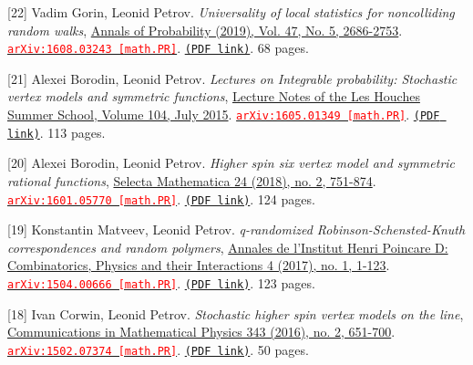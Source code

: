 \begin{etaremune}
\item[{[22]}] 
Vadim Gorin, Leonid Petrov.
\emph{Universality of local statistics for noncolliding random walks}, \href{}{Annals of Probability (2019), Vol. 47, No. 5, 2686-2753}. 
\href{https://arxiv.org/abs/1608.03243}{\texttt{{\textcolor{red}{arXiv:1608.03243 [math.PR]}}}}. \href{https://storage.lpetrov.cc/papers/22-universality_of_local.pdf}{\texttt{(PDF link)}}. 68 pages.



\item[{[21]}] 
Alexei Borodin, Leonid Petrov.
\emph{Lectures on Integrable probability: Stochastic vertex models and symmetric functions}, \href{https://global.oup.com/academic/product/stochastic-processes-and-random-matrices-9780198797319?lang=en&cc=us}{Lecture Notes of the Les Houches Summer School, Volume 104, July 2015}. 
\href{https://arxiv.org/abs/1605.01349}{\texttt{{\textcolor{red}{arXiv:1605.01349 [math.PR]}}}}. \href{https://storage.lpetrov.cc/papers/21-lectures_on_integrable.pdf}{\texttt{(PDF link)}}. 113 pages.



\item[{[20]}] 
Alexei Borodin, Leonid Petrov.
\emph{Higher spin six vertex model and symmetric rational functions}, \href{https://link.springer.com/article/10.1007/s00029-016-0301-7}{Selecta Mathematica 24 (2018), no. 2, 751-874}. 
\href{https://arxiv.org/abs/1601.05770}{\texttt{{\textcolor{red}{arXiv:1601.05770 [math.PR]}}}}. \href{https://storage.lpetrov.cc/papers/20-higher_spin_six.pdf}{\texttt{(PDF link)}}. 124 pages.









\item[{[19]}] 
Konstantin Matveev, Leonid Petrov.
\emph{q-randomized Robinson-Schensted-Knuth correspondences and random polymers}, \href{http://www.ems-ph.org/journals/show_abstract.php?issn=2308-5827&vol=4&iss=1&rank=1}{Annales de l'Institut Henri Poincare D: Combinatorics, Physics and their Interactions 4 (2017), no. 1, 1-123}. 
\href{https://arxiv.org/abs/1504.00666}{\texttt{{\textcolor{red}{arXiv:1504.00666 [math.PR]}}}}. \href{https://storage.lpetrov.cc/papers/19-qrandomized_robinsonschenstedknuth_correspondences.pdf}{\texttt{(PDF link)}}. 123 pages.





\item[{[18]}] 
Ivan Corwin, Leonid Petrov.
\emph{Stochastic higher spin vertex models on the line}, \href{https://link.springer.com/article/10.1007/s00220-015-2479-5}{Communications in Mathematical Physics 343 (2016), no. 2, 651-700}. 
\href{https://arxiv.org/abs/1502.07374}{\texttt{{\textcolor{red}{arXiv:1502.07374 [math.PR]}}}}. \href{https://storage.lpetrov.cc/papers/18-stochastic_higher_spin.pdf}{\texttt{(PDF link)}}. 50 pages.














\end{etaremune}
